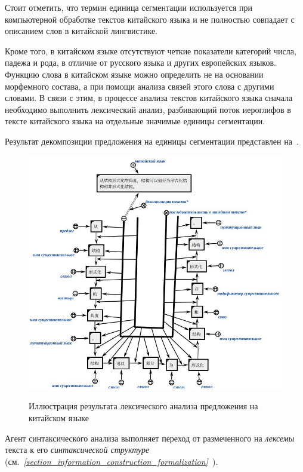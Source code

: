 Стоит отметить, что термин единица сегментации используется при компьютерной обработке текстов китайского языка и не полностью совпадает с описанием слов в китайской лингвистике.

Кроме того, в китайском языке отсутствуют четкие показатели категорий числа, падежа и рода, в отличие от русского языка и других европейских языков.
Функцию слова в китайском языке можно определить не на основании морфемного состава, а при помощи анализа связей этого слова с другими словами.
В связи с этим, в процессе анализа текстов китайского языка сначала необходимо выполнить лексический анализ, разбивающий поток иероглифов в тексте китайского языка на отдельные значимые единицы сегментации.

Результат декомпозиции предложения на единицы сегментации представлен на~\textit{}.

\begin{figure}[H]
	\centering
	\caption{Иллюстрация результата лексического анализа предложения на китайском языке}
	\includegraphics[scale=0.6]{images/part4/chapter_chinese/segment_chinese_sentence}
	\label{fig:segment-chinese}
\end{figure}

Агент синтаксического анализа выполняет переход от размеченного на \textit{лексемы} текста к его \textit{синтаксической структуре} (см.~\textit{\ref{section_information_construction_formalization}~}).

